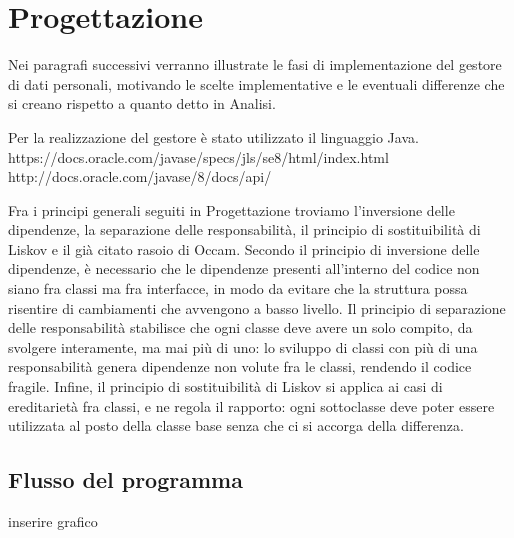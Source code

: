 \chapter{Progettazione}
\label{capitolo5}
\thispagestyle{empty}

\noindent Nei paragrafi successivi verranno illustrate le fasi di implementazione del gestore di dati personali, motivando le scelte implementative e le eventuali differenze che si creano rispetto a quanto detto in Analisi.

Per la realizzazione del gestore \`e stato utilizzato il linguaggio Java. https://docs.oracle.com/javase/specs/jls/se8/html/index.html http://docs.oracle.com/javase/8/docs/api/

Fra i principi generali seguiti in Progettazione troviamo l’inversione delle dipendenze, la separazione delle responsabilit\`a, il principio di sostituibilit\`a di Liskov e il gi\`a citato rasoio di Occam. Secondo il principio di inversione delle dipendenze, \`e necessario che le dipendenze presenti all’interno del codice non siano fra classi ma fra interfacce, in modo da evitare che la struttura possa risentire di cambiamenti che avvengono a basso livello. Il principio di separazione delle responsabilit\`a stabilisce che ogni classe deve avere un solo compito, da svolgere interamente, ma mai pi\`u di uno: lo sviluppo di classi con pi\`u di una responsabilit\`a genera dipendenze non volute fra le classi, rendendo il codice fragile. Infine, il principio di sostituibilit\`a di Liskov si applica ai casi di ereditariet\`a fra classi, e ne regola il rapporto: ogni sottoclasse deve poter essere utilizzata al posto della classe base senza che ci si accorga della differenza.

\section{Flusso del programma}
inserire grafico

